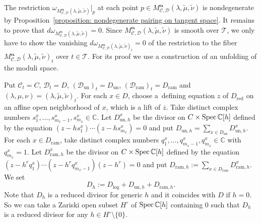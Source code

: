 \documentclass[pdftex]{sigma}
\numberwithin{equation}{section}
\newcommand\Spec{\mathop{\rm Spec}\nolimits}
\newcommand{\balpha}{\boldsymbol \alpha}
\begin{document}
The restriction
$\omega_{M^{\balpha}_{{\mathcal C},{\mathcal D}}(\lambda,\tilde{\mu},\tilde{\nu})}|_p$
at each point
$p\in M^{\balpha}_{{\mathcal C},{\mathcal D}}(\lambda,\tilde{\mu},\tilde{\nu})$
is nondegenerate by
Proposition~\ref{proposition: nondegenerate pairing on tangent space}.
It remains to prove that
$d\omega_{M^{\balpha}_{{\mathcal C},{\mathcal D}}(\lambda,\tilde{\mu},\tilde{\nu})}=0$.
Since
$M^{\balpha}_{{\mathcal C},{\mathcal D}}(\lambda,\tilde{\mu},\tilde{\nu})$
is smooth over ${\mathcal T}$,
we only have to show the vanishing
$d\omega_{M^{\balpha}_{{\mathcal C},{\mathcal D}}(\lambda,\tilde{\mu},\tilde{\nu})_t}=0$
of the restriction to the fiber
$M^{\balpha}_{{\mathcal C},{\mathcal D}}(\lambda,\tilde{\mu},\tilde{\nu})_t$
over $t\in{\mathcal T}$.
For its proof we use a construction of an unfolding of
the moduli space.

Put ${\mathcal C}_t=C$,
${\mathcal D}_t=D$, $({\mathcal D}_{\mathrm{un}})_t=D_{\mathrm{un}}$,
$({\mathcal D}_{\mathrm{ram}})_t=D_{\mathrm{ram}}$ and
$(\lambda,\mu,\nu)=(\lambda,\tilde{\mu},\tilde{\nu})_t$.
For each ${x\in D}$, choose a~defining equation $z$ of
$D_{\mathrm{red}}$ on an affine open neighborhood of
$x$, which is a lift of $\overline{z}$.
Take distinct complex numbers
$s^x_1,\dots,s^x_{m_x-1},s^x_{m_x}\in\mathbb{C}$.
Let $D^x_{\mathrm{un},h}$
be the divisor on $C\times \Spec\mathbb{C}[h]$
defined by the equation
$(z-hs^x_1)\cdots(z-hs^x_{m_x})=0$
and put $D_{\mathrm{un},h}=\sum_{x\in D_{\mathrm{un}}} D^x_{\mathrm{un},h}$.
For each $x\in D_{\mathrm{ram}}$, take distinct complex numbers
$q^x_1,\dots,q^x_{m_x-1},q^x_{m_x}\in\mathbb{C}$
with $q^x_{m_x}=1$.
Let $D^x_{\mathrm{ram},h}$ be the divisor on $C\times\Spec\mathbb{C}[h]$
defined by the equation
$(z-h^rq^x_1)\cdots(z-h^rq^x_{m_x-1})(z-h^r)=0$
and put
$D_{\mathrm{ram},h}:=\sum_{x\in D_{\mathrm{ram}}} D^x_{\mathrm{ram},h}$.
We set
\[
 D_h:=D_{\mathrm{log}}+D_{\mathrm{un},h}+D_{\mathrm{ram},h}.
\]
Note that $D_h$ is a reduced divisor for generic $h$ and
it coincides with $D$ if $h=0$.
So we can take a Zariski open subset
$H^{\circ}$ of $\Spec\mathbb{C}[h]$ containing $0$ such that
$D_h$ is a reduced divisor for any
$h\in H^{\circ}\setminus\{0\}$.
\end{document}
